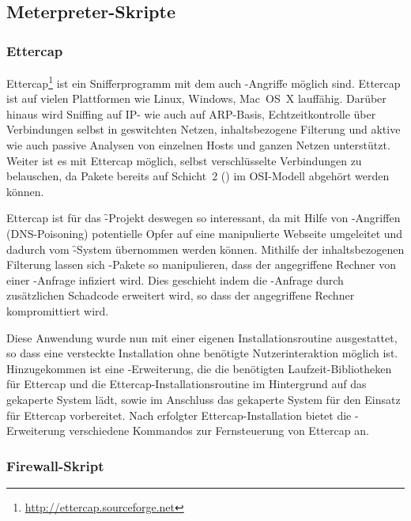 \subsection{Meterpreter-Skripte}
\label{sec:msf:scripts}

\subsubsection{Ettercap}
\authors{\DH}{\LM \and \DE \and \MW \and \JF}

Ettercap\footnote{\url{http://ettercap.sourceforge.net}} ist ein
Snifferprogramm mit dem auch -Angriffe möglich sind.
Ettercap ist auf vielen Plattformen wie Linux, Windows, Mac~OS~X \uA
lauffähig. Darüber hinaus wird Sniffing auf IP- wie auch auf ARP-Basis,
Echtzeitkontrolle über Verbindungen selbst in geswitchten Netzen,
inhaltsbezogene Filterung und aktive wie auch passive Analysen von einzelnen
Hosts und ganzen Netzen unterstützt. Weiter ist es mit Ettercap möglich,
selbst verschlüsselte Verbindungen zu belauschen, da Pakete bereits auf
Schicht~2 () im OSI-Modell abgehört werden können.

Ettercap ist für das \f-Projekt deswegen so interessant, da \zB mit
Hilfe von -Angriffen (DNS-Poisoning) potentielle
Opfer auf eine manipulierte Webseite umgeleitet und dadurch vom
\f-System übernommen werden können. Mithilfe der inhaltsbezogenen
Filterung lassen sich -Pakete so manipulieren, dass der
angegriffene Rechner von einer -Anfrage infiziert wird. Dies
geschieht indem die -Anfrage durch zusätzlichen Schadcode
erweitert wird, so dass der angegriffene Rechner kompromittiert wird.

Diese Anwendung wurde nun mit einer eigenen Installationsroutine
ausgestattet, so dass eine versteckte Installation ohne benötigte
Nutzerinteraktion möglich ist. Hinzugekommen ist eine
-Erweiterung, die die benötigten Laufzeit-Bibliotheken für
Ettercap und die Ettercap-Installationsroutine im Hintergrund auf das
gekaperte System lädt, sowie im Anschluss das gekaperte System für den
Einsatz für Ettercap vorbereitet. Nach erfolgter Ettercap-Installation
bietet die -Erweiterung verschiedene Kommandos zur
Fernsteuerung von Ettercap an.

\subsubsection{Firewall-Skript}
\authors{\LM}{\WF \and \MW \and \JF}

